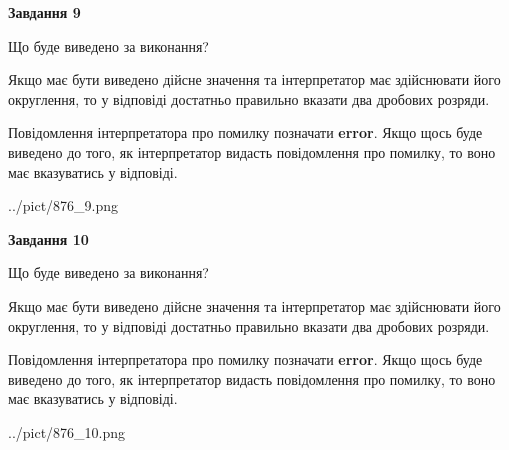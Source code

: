 \documentclass[12pt, ukrainian]{article}
\begin{document}
{\begin {Large}
{\begin {center}\textbf{Завдання 9}\end {center}}\par
Що буде виведено за виконання? \par

Якщо має бути виведено дійсне значення та інтерпретатор має здійснювати його округлення, 
то у відповіді достатньо правильно вказати два дробових розряди.

Повідомлення інтерпретатора про помилку позначати \textbf{error}.
Якщо щось буде виведено до того, як інтерпретатор видасть повідомлення про помилку, 
то воно має вказуватись у відповіді. \par

\begin{center}
	{../pict/876_9.png}
\end{center}
\newpage

{\begin {center}\textbf{Завдання 10}\end {center}}\par
Що буде виведено за виконання? \par

Якщо має бути виведено дійсне значення та інтерпретатор має здійснювати його округлення, 
то у відповіді достатньо правильно вказати два дробових розряди.

Повідомлення інтерпретатора про помилку позначати \textbf{error}.
Якщо щось буде виведено до того, як інтерпретатор видасть повідомлення про помилку, 
то воно має вказуватись у відповіді. \par

\begin{center}
	{../pict/876_10.png}
\end{center}
\newpage

\end {Large}}
\end{document}
